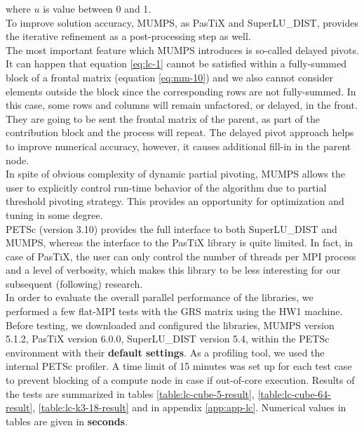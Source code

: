 where $u$ is value between 0 and 1.\\

To improve solution accuracy, MUMPS, as PasTiX and SuperLU\_DIST, provides the iterative refinement as a post-processing step as well.\\


The most important feature which MUMPS introduces is so-called delayed pivots. It can happen that equation \ref{eq:lc-1} cannot be satisfied within a fully-summed block of a frontal matrix (equation  \ref{eq:mm-10}) and we also cannot consider elements outside the block since the corresponding rows are not fully-summed. In this case, some rows and columns will remain unfactored, or delayed, in the front. They are going to be sent the frontal matrix of the parent, as part of the contribution block and the process will repeat. The delayed pivot approach helps to improve numerical accuracy, however, it causes additional fill-in in the parent node.\\


In spite of obvious complexity of dynamic partial pivoting, MUMPS allows the user to explicitly control run-time behavior of the algorithm due to partial threshold pivoting strategy. This provides an opportunity for optimization and tuning in some degree.\\


PETSc (version 3.10) provides the full interface to both SuperLU\_DIST and MUMPS, whereas the interface to the PasTiX library is quite limited. In fact, in case of PasTiX, the user can only control the number of threads per MPI process and a level of verbosity, which makes this library to be less interesting for our subsequent (following) research.\\


In order to evaluate the overall parallel performance of the libraries, we performed a few flat-MPI tests with the GRS matrix using the HW1 machine. Before testing, we downloaded and configured the libraries, MUMPS version 5.1.2, PasTiX version 6.0.0, SuperLU\_DIST version 5.4, within the PETSc environment with their \textbf{default settings}. As a profiling tool, we used the internal PETSc profiler. A time limit of 15 minutes was set up for each test case to prevent blocking of a compute node in case if out-of-core execution. Results of the tests are summarized in tables \ref{table:lc-cube-5-result}, \ref{table:lc-cube-64-result}, \ref{table:lc-k3-18-result} and in appendix \ref{app:app-lc}. Numerical values in tables are given in \textbf{seconds}.\\


